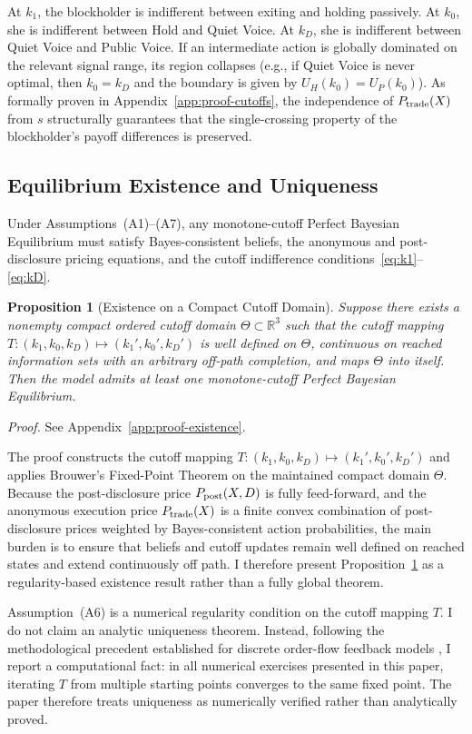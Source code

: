 \documentclass[11pt]{article}
\newtheorem{proposition}{Proposition}
\newcommand{\1}{\mathbf{1}}
\newcommand{\R}{\mathbb{R}}
\begin{document}
At $k_1$, the blockholder is indifferent between exiting and holding passively. At $k_0$, she is indifferent between Hold and Quiet Voice. At $k_D$, she is indifferent between Quiet Voice and Public Voice. If an intermediate action is globally dominated on the relevant signal range, its region collapses (e.g., if Quiet Voice is never optimal, then $k_0=k_D$ and the boundary is given by $U_H(k_0)=U_P(k_0)$). As formally proven in Appendix~\ref{app:proof-cutoffs}, the independence of $P_{\textup{trade}}(X)$ from $s$ structurally guarantees that the single-crossing property of the blockholder's payoff differences is preserved.

%
\subsection{Equilibrium Existence and Uniqueness}

Under Assumptions~\textup{(A1)}--\textup{(A7)}, any monotone-cutoff Perfect Bayesian Equilibrium must satisfy Bayes-consistent beliefs, the anonymous and post-disclosure pricing equations, and the cutoff indifference conditions~\eqref{eq:k1}--\eqref{eq:kD}.

\begin{proposition}[Existence on a Compact Cutoff Domain]
\label{prop:existence}
Suppose there exists a nonempty compact ordered cutoff domain $\Theta \subset \R^3$ such that the cutoff mapping $T:(k_1,k_0,k_D)\mapsto(k_1',k_0',k_D')$ is well defined on $\Theta$, continuous on reached information sets with an arbitrary off-path completion, and maps $\Theta$ into itself. Then the model admits at least one monotone-cutoff Perfect Bayesian Equilibrium.
\end{proposition}
\textit{Proof.} See Appendix~\ref{app:proof-existence}.

The proof constructs the cutoff mapping $T:(k_1,k_0,k_D)\mapsto(k_1',k_0',k_D')$ and applies Brouwer's Fixed-Point Theorem on the maintained compact domain $\Theta$. Because the post-disclosure price $P_{\textup{post}}(X,D)$ is fully feed-forward, and the anonymous execution price $P_{\textup{trade}}(X)$ is a finite convex combination of post-disclosure prices weighted by Bayes-consistent action probabilities, the main burden is to ensure that beliefs and cutoff updates remain well defined on reached states and extend continuously off path. I therefore present Proposition~\ref{prop:existence} as a regularity-based existence result rather than a fully global theorem.

Assumption~\textup{(A6)} is a numerical regularity condition on the cutoff mapping $T$. I do not claim an analytic uniqueness theorem. Instead, following the methodological precedent established for discrete order-flow feedback models \citep{EdmansGoldsteinJiang2015}, I report a computational fact: in all numerical exercises presented in this paper, iterating $T$ from multiple starting points converges to the same fixed point. The paper therefore treats uniqueness as numerically verified rather than analytically proved.
\end{document}
